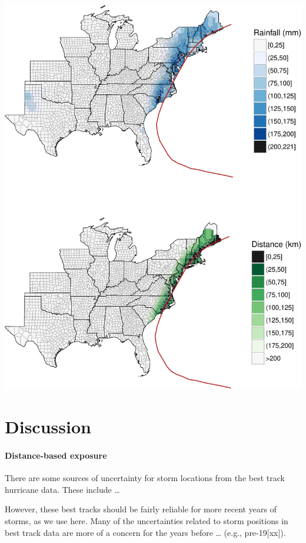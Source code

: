 \documentclass[]{elsarticle} %
\makeatletter
\def\maxwidth{\ifdim\Gin@nat@width>\linewidth\linewidth
\else\Gin@nat@width\fi}
\let\Oldincludegraphics\includegraphics
\renewcommand{\includegraphics}[1]{\Oldincludegraphics[width=\maxwidth]{#1}}
\makeatother
\begin{document}
\includegraphics{DraftExposurePaper_files/figure-latex/unnamed-chunk-2-1.pdf}

\section{Discussion}\label{discussion}

\paragraph{Distance-based exposure}\label{distance-based-exposure-1}

There are some sources of uncertainty for storm locations from the best
track hurricane data. These include \ldots{}

However, these best tracks should be fairly reliable for more recent
years of storms, as we use here. Many of the uncertainties related to
storm positions in best track data are more of a concern for the years
before \ldots{} (e.g., pre-19{[}xx{]}).
\end{document}
